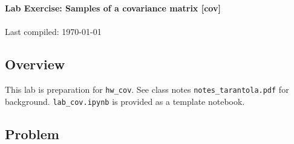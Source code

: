 \documentclass[11pt,titlepage,fleqn]{article}
\begin{document}

\begin{spacing}{1.2}
\begin{center}
{\large \bf Lab Exercise: Samples of a covariance matrix [cov]} \\
\cltag\ \\
Last compiled: \today
\end{center}
\end{spacing}


\vspace{-0.5cm}
\subsection*{Overview}

This lab is preparation for \verb+hw_cov+. See class notes \verb+notes_tarantola.pdf+ for background. \verb+lab_cov.ipynb+ is provided as a template notebook.

\subsection*{Problem}
\end{document}
